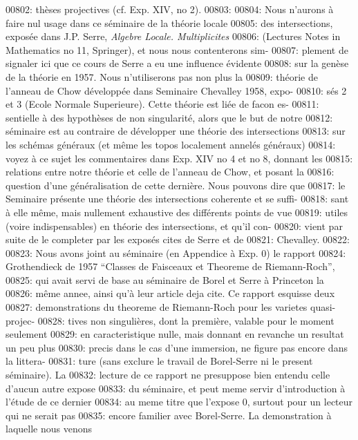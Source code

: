 00802: th\`eses projectives (cf. Exp. XIV, no 2).
00803: 
00804: Nous n'aurons \`a faire nul usage dans ce s\'eminaire de la th\'eorie locale
00805: des intersections, expos\'ee dans J.P. Serre, \textit{Algebre Locale. Multiplicites}
00806: (Lectures Notes in Mathematics no 11, Springer), et nous nous contenterons sim-
00807: plement de signaler ici que ce cours de Serre a eu une influence \'evidente
00808: sur la gen\`ese de la th\'eorie en 1957. Nous n'utiliserons pas non plus la
00809: th\'eorie de l'anneau de Chow d\'evelopp\'ee dans Seminaire Chevalley 1958, expo-
00810: s\'es 2 et 3 (Ecole Normale Superieure). Cette th\'eorie est li\'ee de facon es-
00811: sentielle \`a des hypoth\`eses de non singularit\'e, alors que le but de notre
00812: s\'eminaire est au contraire de d\'evelopper une th\'eorie des intersections
00813: sur les sch\'emas g\'en\'eraux (et m\^eme les topos localement annel\'es g\'en\'eraux)
00814: voyez \`a ce sujet les commentaires dans Exp. XIV no 4 et no 8, donnant les
00815: relations entre notre th\'eorie et celle de l'anneau de Chow, et posant la
00816: question d'une g\'en\'eralisation de cette derni\`ere. Nous pouvons dire que
00817: le Seminaire pr\'esente une th\'eorie des intersections coherente et se suffi-
00818: sant \`a elle m\^eme, mais nullement exhaustive des diff\'erents points de vue
00819: utiles (voire indispensables) en th\'eorie des intersections, et qu'il con-
00820: vient par suite de le completer par les expos\'es cites de Serre et de
00821: Chevalley.
00822: 
00823: Nous avons joint au s\'eminaire (en Appendice \`a Exp. 0) le rapport
00824: Grothendieck de 1957 ``Classes de Faisceaux et Theoreme de Riemann-Roch'',
00825: qui avait servi de base au s\'eminaire de Borel et Serre \`a Princeton la
00826: m\^eme annee, ainsi qu'\`a leur article deja cite. Ce rapport esquisse deux
00827: demonstrations du theoreme de Riemann-Roch pour les varietes quasi-projec-
00828: tives non singuli\`eres, dont la premi\`ere, valable pour le moment seulement
00829: en caracteristique nulle, mais donnant en revanche un resultat un peu plus
00830: precis dans le cas d'une immersion, ne figure pas encore dans la littera-
00831: ture (sans exclure le travail de Borel-Serre ni le present s\'eminaire). La
00832: lecture de ce rapport ne presuppose bien entendu celle d'aucun autre expose
00833: du s\'eminaire, et peut meme servir d'introduction \`a l'\'etude de ce dernier
00834: au meme titre que l'expose 0, surtout pour un lecteur qui ne serait pas
00835: encore familier avec Borel-Serre. La demonstration \`a laquelle nous venons
